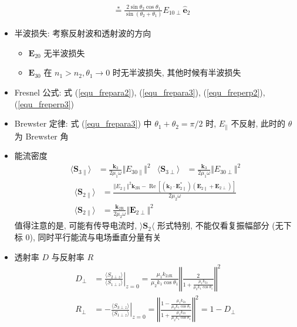 \documentclass[12pt,a4paper]{article}%
\numberwithin{equation}{section}%
\renewcommand*{\vec}[1]{\bm{#1}}%
\newcommand*{\uvec}[1]{\hat{\vec{#1}}}
\renewcommand*{\Re}{\operatorname{Re}}
\begin{document}
\begin{enumerate}
\begin{itemize}
\begin{align}
            &\stackrel{*}{=} \frac{2\sin\theta_2\cos\theta_1}{\sin(\theta_2 + \theta_1)}E_{10\perp}\uvec e_2 \label{equ_freperp3}
        \end{align}
        \begin{itemize}
            \item 半波损失: 考察反射波和透射波的方向
            \begin{itemize}
                \item $\vec E_{20}$ 无半波损失
                \item $\vec E_{30}$ 在 $n_1>n_2, \theta_1\to 0$ 时无半波损失, 其他时候有半波损失
            \end{itemize}
            \item Fresnel 公式: 式 (\ref{equ_frepara2}), (\ref{equ_frepara3}), (\ref{equ_freperp2}), (\ref{equ_freperp3})
            \item Brewster 定律: 式 (\ref{equ_frepara3}) 中 $\theta_1 + \theta_2 = \pi/2$ 时, $E_{\parallel}$ 不反射, 此时的 $\theta$ 为 Brewster 角
            \item 能流密度
            \begin{align}
                \langle\vec S_{3\parallel}\rangle &=  \frac{\vec k_3}{2\mu_1\omega}\Vert E_{30\parallel}\Vert^2 &
                \langle\vec S_{3\perp}\rangle &= \frac{\vec k_3}{2\mu_1\omega}\Vert E_{30\perp}\Vert^2
            \end{align}
            \begin{align}
                \langle\vec S_{2\parallel}\rangle &= \frac{\Vert E_{2\parallel}\Vert^2\vec k_{2\mathrm R} - \Re[(\vec k_2\cdot\vec E_{2\parallel}^*)(\vec E_{2\parallel} + \vec E_{2\perp})]}{2\mu_2\omega} \\
                \langle\vec S_{2\parallel}\rangle &= \frac{\vec k_{2\mathrm R}}{2\mu_2\omega}\Vert\vec E_{2\perp}\Vert^2
            \end{align}
            值得注意的是, 可能有传导电流时, $\rangle\vec S_2 \langle$ 形式特别, 不能仅看复振幅部分 (无下标 $0$), 同时平行能流与电场垂直分量有关
            \item 透射率 $D$ 与反射率 $R$
            \begin{align}
                D_\perp &= \left.\frac{\langle S_{2\perp z}\rangle}{\langle S_{1\perp z}\rangle}\right|_{z=0} = \frac{\mu_1k_{2z\mathrm R}}{\mu_2k_1\cos\theta_1}\left\Vert\frac{2}{1+\frac{\mu_1k_{2z}}{\mu_2k_1\cos\theta_1}}\right\Vert^2 \\
                R_\perp &= -\left.\frac{\langle S_{3\perp z}\rangle}{\langle S_{1\perp z}\rangle}\right|_{z=0} = \left\Vert\frac{1-\frac{\mu_1k_{2z}}{\mu_2k_1\cos\theta_1}}{1+\frac{\mu_1k_{2z}}{\mu_2k_1\cos\theta_1}}\right\Vert^2 = 1-D_\perp \\

\end{align}
\end{itemize}
\end{itemize}
\end{enumerate}
\end{document}
